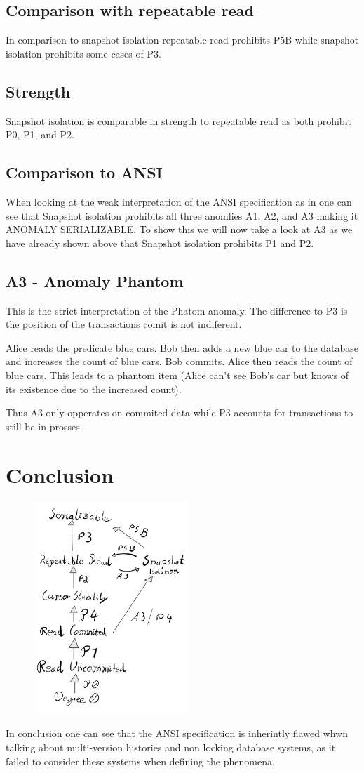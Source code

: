 \documentclass[sigconf, review=true]{acmart}
\begin{document}
\subsection{Comparison with repeatable read}
In comparison to snapshot isolation repeatable read prohibits P5B while snapshot isolation prohibits some cases of
P3.
\subsection{Strength}
Snapshot isolation is comparable in strength to repeatable read as both prohibit P0, P1, and P2.
\subsection{Comparison to ANSI}
When looking at the weak interpretation of the ANSI specification as in \cite{Adya_Liskov_O_Neil_2000}
one can see that Snapshot isolation prohibits all three anomlies A1, A2, and A3 making it ANOMALY SERIALIZABLE.
To show this we will now take a look at A3 as we have already shown above that Snapshot isolation prohibits P1 and P2.
\subsection{A3 - Anomaly Phantom}
This is the strict interpretation of the Phatom anomaly. The difference to P3 is the position of the
transactions comit is not indiferent.
\begin{example}
    Alice reads the predicate blue cars. Bob then adds a new blue car to the database and increases
    the count of blue cars. Bob commits.  Alice then reads the count of blue cars. This leads to a phantom item
    (Alice can’t see Bob's car but knows of its existence due to the increased count).
\end{example}
Thus A3 only opperates on commited data while P3 accounts for transactions to still be in prosses.
\section{Conclusion}
\includegraphics[width=8cm, height=8cm]{iso_lvl_dia.png}

In conclusion one can see that the ANSI specification is inherintly flawed whwn talking
about multi-version histories and non locking database systems, as it failed to consider
these systems when defining the phenomena.


\end{document}

